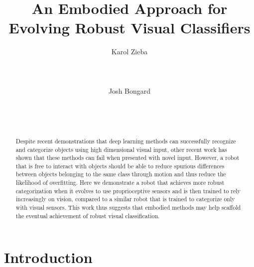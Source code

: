 \documentclass{sig-alternate}
\begin{document}
\title{An Embodied Approach for\\Evolving Robust Visual Classifiers}

\author{
  \alignauthor Karol Zieba \\
   \\
   \\
   \\
  \alignauthor Josh Bongard \\
   \\
   \\
   \\
}
\date{}

\maketitle

\begin{abstract}
  
Despite recent demonstrations that deep learning methods can successfully recognize and categorize objects using high dimensional visual input, other recent work has shown that these methods can fail when presented with novel input. However, a robot that is free to interact with objects should be able to reduce spurious differences between objects belonging to the same class through motion and thus reduce the likelihood of overfitting. Here we demonstrate a robot that achieves more robust categorization when it evolves to use proprioceptive sensors and is then trained to rely increasingly on vision, compared to a similar robot that is trained to categorize only with visual sensors. This work thus suggests that embodied methods may help scaffold the eventual achievement of robust visual classification.
\end{abstract}

 



\section{Introduction}
\end{document}
